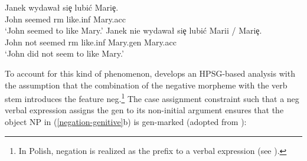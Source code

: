 \documentclass[output=paper
                ,modfonts
                ,nonflat
	        ,collection
	        ,collectionchapter
	        ,collectiontoclongg
 	        ,biblatex
                ,babelshorthands
                ,newtxmath
                ,draftmode
                ,colorlinks, citecolor=brown
]{./langsci/langscibook}
\begin{document}
{\begin{exe}
\begin{xlist}
\eal
\ex \label{negation-genitive-1}
\gll  Janek wydawa\l{} si\c{e} lubi\'{c} Mari\c{e}.\\
      John seemed {\sc rm}     like.{\sc inf} Mary.{\sc acc}\\
\glt `John seemed to like Mary.'
\ex
\gll  Janek nie wydawa\l{} si\c{e} lubi\'{c} Marii / Mari\c{e}.\\
      John not seemed {\sc rm} like.{\sc inf}      Mary.{\sc gen} {} Mary.{\sc acc}\\
\glt `John did not seem to like Mary.'
\zl

\iffalse{
\eal
\ex \label{negation-genitive-1}
\gll Pisz\c{e} listy /*list\'{o}w.
     write.1{\sc sg} letters.{\sc acc}/letters.{\sc gen}\\
\glt `I am writing letters.'

\ex
\gll Nie chcialem   pisa\'{c} list\'{o}w. \\
     not wanted.1\sg.\mas{} write.{\sc inf} letters.{\sc gen}\\
\glt `I didn't want to write letters.'
\zl}\fi
To account for this kind of phenomenon, \citet{Prz:00} develops
an HPSG-based analysis with the assumption that the combination of the
negative morpheme  with the verb stem introduces the
feature {\sc neg}.\footnote{In Polish,  negation is realized as the prefix
   to a verbal expression (see \citealt{PK:99, Prz:00, Prz:01}).} The
  case assignment constraint such that a {\sc neg} verbal expression assigns
  the {\sc gen} to its non-initial argument ensures that
  the object NP in (\ref{negation-genitive}b) is {\sc gen}-marked (adopted from \citealt[]{Prz:00}):


\end{xlist}
\end{exe}}
\end{document}
